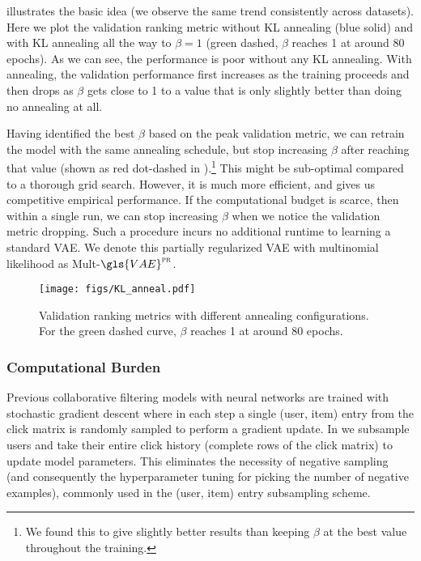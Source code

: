 \documentclass[sigconf]{acmart}
\newcommand{\mvae}{{\small Mult-}$\gls{VAE}^{\text{\sc pr}}$}
\begin{document}
 illustrates the basic idea (we observe the same trend consistently across datasets). 
Here we plot the validation ranking metric without KL annealing (blue solid) 
and with KL annealing all the way to $\beta = 1$ (green dashed, $\beta$ reaches 1 at around 80 epochs). 
As we can see, the performance is poor without any KL annealing. 
With annealing, the validation performance first increases as the training proceeds and then drops as $\beta$ gets close to 1 to a value that is only slightly better
than doing no annealing at all. 

Having identified the best $\beta$ based on the peak validation metric, we can 
retrain the model with the same annealing schedule, but stop increasing $\beta$ after reaching 
that value (shown as red dot-dashed in ).\footnote{We found this to give slightly better results 
than keeping $\beta$ at the best value throughout the training.} This might be sub-optimal 
compared to a thorough grid search. However, it is much more efficient, and gives us competitive empirical performance. If the computational budget 
is scarce, then within a single run, we can stop increasing $\beta$ when we notice the validation metric dropping.
Such a procedure incurs no additional runtime to learning a standard \gls{VAE}.
We denote this partially regularized \gls{VAE} with multinomial likelihood as \mvae.

\begin{figure}[!ht]
  \centering
  \texttt{[image: figs/KL\_anneal.pdf]}
  \caption{Validation ranking metrics with different annealing configurations. For the green dashed curve, $\beta$ reaches 1 at around 80 epochs.}
  \label{fig:kl_anneal}
\end{figure}

\subsubsection{Computational Burden} Previous collaborative filtering models with 
neural networks \citep{he2017neural,wu2016collaborative} are trained with stochastic gradient descent
where in each step a single (user, item) entry from the click matrix is randomly sampled to perform a gradient update. 
In  we subsample users and take their entire click history (complete rows of the click matrix) to update model parameters.
This eliminates the necessity of negative sampling (and consequently the hyperparameter tuning for picking the number of negative examples), commonly used in the (user, item) entry subsampling scheme. 
\end{document}
